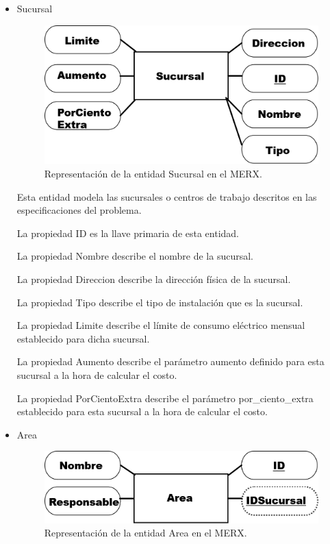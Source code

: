 \documentclass{article}
\begin{document}
\begin{itemize}
\item Sucursal

\begin{figure}
\includegraphics[scale=0.5]{Imagenes/Informe1/EntidadSucursal.png}
\caption{Representación de la entidad Sucursal en el MERX.}
\label{entidadSucursal}
\end{figure}

Esta entidad modela las sucursales o centros de trabajo descritos en las especificaciones del problema.

La propiedad ID es la llave primaria de esta entidad.

La propiedad Nombre describe el nombre de la sucursal.

La propiedad Direccion describe la dirección física de la sucursal.

La propiedad Tipo describe el tipo de instalación que es la sucursal.

La propiedad Limite describe el límite de consumo eléctrico mensual establecido para dicha sucursal.

La propiedad Aumento describe el parámetro aumento definido para esta sucursal a la hora de calcular el costo.

La propiedad PorCientoExtra describe el parámetro por\_ciento\_extra establecido para esta sucursal a la hora de calcular el costo.
\item Area

\begin{figure}
\includegraphics[scale=0.5]{Imagenes/Informe1/EntidadArea.png}
\caption{Representación de la entidad Area en el MERX.}
\label{entidadArea}
\end{figure}


\end{itemize}
\end{document}
